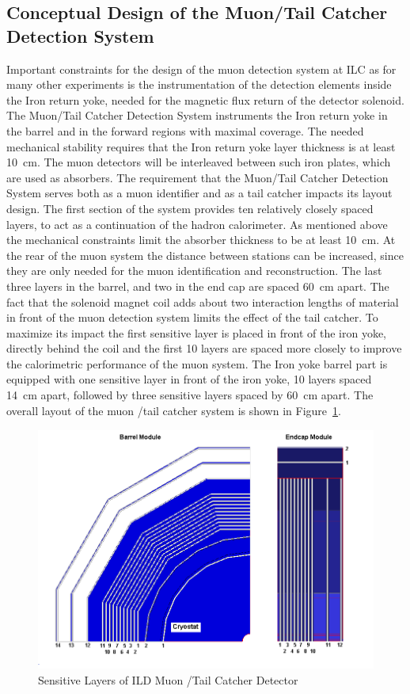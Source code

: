 \subsection{Conceptual Design of the Muon/Tail Catcher Detection System}
Important constraints for the design of the muon detection system at ILC as for many other experiments is the instrumentation of the detection elements inside the Iron return yoke, needed for the magnetic flux return of the detector solenoid.
The Muon/Tail Catcher Detection System instruments the Iron return yoke in the barrel and in the forward regions with maximal coverage.
The needed mechanical stability requires that the Iron return yoke layer thickness is at least \SI{10}{cm}. The muon detectors will be interleaved between such iron plates, which are used as absorbers.
The requirement that the Muon/Tail Catcher Detection System serves both as a muon identifier and as a tail catcher impacts its layout design.
The first section of the system provides ten relatively closely spaced layers, to act as a continuation of the hadron calorimeter.
As mentioned above the mechanical constraints limit the absorber thickness to be at least \SI{10}{cm}.
At the rear of the muon system the distance between stations can be increased, since they are only needed for the muon identification and reconstruction.
The last three layers in the barrel, and two in the end cap are spaced \SI{60}{cm} apart.
The fact that the solenoid magnet coil adds about two interaction lengths of material in front of the muon detection system limits the effect of the tail catcher.
To maximize its impact the first sensitive layer is placed in front of the iron yoke, directly behind the coil and the first 10 layers are spaced more closely to improve the calorimetric performance of the muon system.
The Iron yoke barrel part is equipped with one sensitive layer in front of the iron yoke, 10 layers spaced \SI{14}{cm} apart, followed by three sensitive layers spaced by \SI{60}{cm} apart. The overall layout of the muon /tail catcher system is shown in Figure~\ref{fig:ild:muon:tailCatcher}.
\begin{figure}
	\centering
	\includegraphics[height=8cm]{MuonDetector/MuonDetectorILD/2D_barel_endcap.png}
	\caption{Sensitive Layers of ILD Muon /Tail Catcher Detector}
	\label{fig:ild:muon:tailCatcher}
\end{figure}

